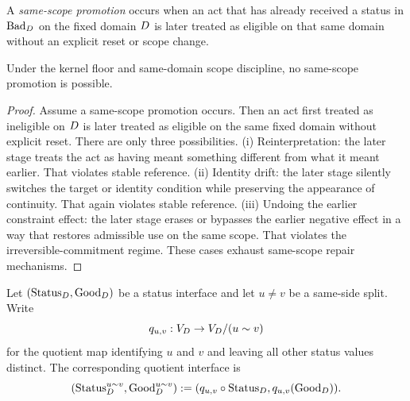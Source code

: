 \begin{definition}
A \emph{same-scope promotion} occurs when an act that has already received a status in $\mathrm{Bad}_D$ on the fixed domain $D$ is later treated as eligible on that same domain without an explicit reset or scope change.
\end{definition}

\begin{lemma}
\label{lem:B-no-promotion}
Under the kernel floor and same-domain scope discipline, no same-scope promotion is possible.
\end{lemma}

\begin{proof}
Assume a same-scope promotion occurs. Then an act first treated as ineligible on $D$ is later treated as eligible on the same fixed domain without explicit reset. There are only three possibilities. (i) Reinterpretation: the later stage treats the act as having meant something different from what it meant earlier. That violates stable reference. (ii) Identity drift: the later stage silently switches the target or identity condition while preserving the appearance of continuity. That again violates stable reference. (iii) Undoing the earlier constraint effect: the later stage erases or bypasses the earlier negative effect in a way that restores admissible use on the same scope. That violates the irreversible-commitment regime. These cases exhaust same-scope repair mechanisms.
\end{proof}

\begin{definition}
Let $(\mathrm{Status}_D,\mathrm{Good}_D)$ be a status interface and let $u\neq v$ be a same-side split. Write
\[
q_{u,v}:V_D\to V_D/(u\sim v)
\]
for the quotient map identifying $u$ and $v$ and leaving all other status values distinct. The corresponding quotient interface is
\[
(\mathrm{Status}^{u\sim v}_D,\mathrm{Good}^{u\sim v}_D):=(q_{u,v}\circ \mathrm{Status}_D,q_{u,v}(\mathrm{Good}_D)).
\]
\end{definition}

